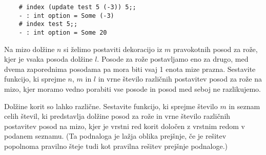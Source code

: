 \documentclass[arhiv]{../izpit}
\begin{document}
	\begin{verbatim}
	# index (update test 5 (-3)) 5;;
	- : int option = Some (-3)
	# index test 5;;
	- : int option = Some 20
	\end{verbatim}
	
	\naloga
	\podnaloga Na mizo dolžine $n$ si želimo postaviti dekoracijo iz $m$ pravokotnih posod za rože, kjer je vsaka posoda dolžine $l$. Posode za rože postavljamo eno za drugo, med dvema zaporednima posodama pa mora biti vsaj 1 enota mize prazna. Sestavite funkcijo, ki sprejme $n$, $m$ in $l$ in vrne število različnih postavitev posod za rože na mizo, kjer moramo vedno porabiti vse posode in posod med seboj ne razlikujemo.
	
	\podnaloga Dolžine korit so lahko različne. Sestavite funkcijo, ki sprejme število $m$ in seznam celih števil, ki predstavlja dolžine posod za rože in vrne število različnih postavitev posod na mizo, kjer je vrstni red korit določen z vrstnim redom v podanem seznamu. (Ta podnaloga je lažja oblika prejšnje, če je rešitev popolnoma pravilno šteje tudi kot pravilna rešitev prejšnje podnaloge.)
	
	
\end{document}
